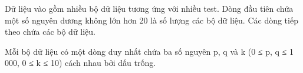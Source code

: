 Dữ liệu vào gồm nhiều bộ dữ liệu tương ứng với nhiều test. Dòng đầu tiên chứa một số nguyên dương không lớn hơn 20 là số lượng các bộ dữ liệu. Các dòng tiếp theo chứa các bộ dữ liệu.

Mỗi bộ dữ liệu có một dòng duy nhất chứa ba số nguyên p, q và k (0 ≤ p, q ≤ 1 000, 0 ≤ k ≤ 10) cách nhau bởi dấu trống.

\